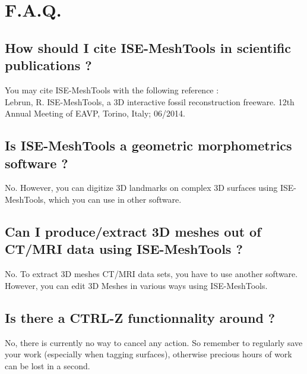 
 \chapter{F.A.Q.}
		\minitoc  
    \section{How should I cite ISE-MeshTools in scientific publications ?}
    You may  cite ISE-MeshTools with the following reference :\\
		Lebrun, R. ISE-MeshTools, a 3D interactive fossil reconstruction freeware. 
		12th Annual Meeting of EAVP, Torino, Italy; 06/2014.
    \section{Is ISE-MeshTools a geometric morphometrics software ?}
    No. However, you can digitize 3D landmarks on complex 3D surfaces using ISE-MeshTools, which you 
		can use in other software.
		\section{Can I produce/extract 3D meshes out of CT/MRI data using ISE-MeshTools ?}
		No. To extract 3D meshes CT/MRI data sets, you have to use another software. However, you can edit 
		3D Meshes in various ways using ISE-MeshTools.
		\section{Is there a CTRL-Z functionnality around ?}
		No, there is currently no way to cancel any action. So remember to regularly save your work (especially when tagging surfaces), otherwise precious hours of work can be lost in a second.